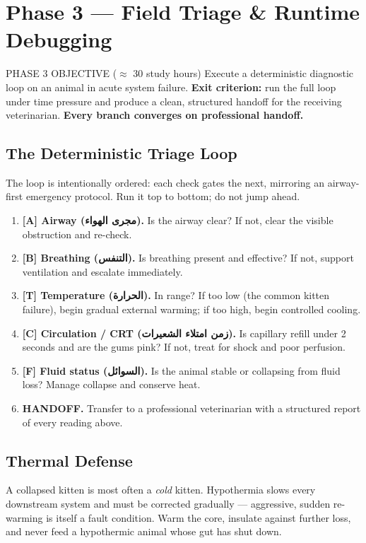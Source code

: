 \documentclass[12pt,oneside]{book}
\newcommand{\ar}[1]{\textarabic{#1}}
\begin{document}
\chapter{Phase 3 --- Field Triage \& Runtime Debugging}

\begin{kumbox}{PHASE 3 OBJECTIVE \quad ($\approx$ 30 study hours)}
Execute a deterministic diagnostic loop on an animal in acute system
failure. \textbf{Exit criterion:} run the full loop under time pressure
and produce a clean, structured handoff for the receiving veterinarian.
\textbf{Every branch converges on professional handoff.}
\end{kumbox}

\section{The Deterministic Triage Loop}
The loop is intentionally ordered: each check gates the next, mirroring an
airway-first emergency protocol. Run it top to bottom; do not jump ahead.

\begin{enumerate}[leftmargin=2.4em,label=\textbf{\arabic*.}]
  \item \textbf{[A] Airway (\ar{مجرى الهواء}).} Is the airway clear? If
        not, clear the visible obstruction and re-check.
  \item \textbf{[B] Breathing (\ar{التنفس}).} Is breathing present and
        effective? If not, support ventilation and escalate immediately.
  \item \textbf{[T] Temperature (\ar{الحرارة}).} In range? If too low
        (the common kitten failure), begin gradual external warming; if
        too high, begin controlled cooling.
  \item \textbf{[C] Circulation / CRT (\ar{زمن امتلاء الشعيرات}).} Is
        capillary refill under 2 seconds and are the gums pink? If not,
        treat for shock and poor perfusion.
  \item \textbf{[F] Fluid status (\ar{السوائل}).} Is the animal stable or
        collapsing from fluid loss? Manage collapse and conserve heat.
  \item \textbf{HANDOFF.} Transfer to a professional veterinarian with a
        structured report of every reading above.
\end{enumerate}

\section{Thermal Defense}
A collapsed kitten is most often a \emph{cold} kitten. Hypothermia slows
every downstream system and must be corrected gradually --- aggressive,
sudden re-warming is itself a fault condition. Warm the core, insulate
against further loss, and never feed a hypothermic animal whose gut has
shut down.
\end{document}
